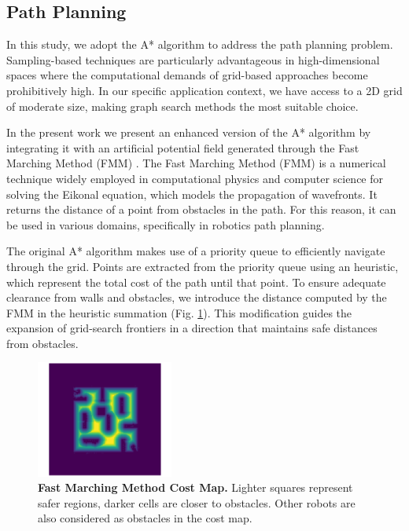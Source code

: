 \subsection{Path Planning}
In this study, we adopt the A* algorithm to address the path planning problem. Sampling-based techniques are particularly advantageous in high-dimensional spaces where the computational demands of grid-based approaches become prohibitively high. In our specific application context, we have access to a 2D grid of moderate size, making graph search methods the most suitable choice.

In the present work we present an enhanced version of the A* algorithm by integrating it with an artificial potential field generated through the Fast Marching Method (FMM) \cite{fast_marching}. 
The Fast Marching Method (FMM) \cite{fast_marching} is a numerical technique widely employed in computational physics and computer science for solving the Eikonal equation, which models the propagation of wavefronts. It returns the distance of a point from obstacles in the path. For this reason, it can be used in various domains, specifically in robotics path planning.

The original A* algorithm makes use of a priority queue to efficiently navigate through the grid. Points are extracted from the priority queue using an heuristic, which represent the total cost of the path until that point. To ensure adequate clearance from walls and obstacles, we introduce the distance computed by the FMM in the heuristic summation (Fig. \ref{fig:costmap}). This modification guides the expansion of grid-search frontiers in a direction that maintains safe distances from obstacles.

\begin{figure}[H]
  \begin{center}
    \includegraphics[width=0.4\textwidth]{img/costmap.png}
  \end{center}
  \caption[]{
    \textbf{Fast Marching Method Cost Map.} 
    Lighter squares represent safer regions, darker cells are closer to obstacles. Other robots are also considered as obstacles in the cost map.
  }
  \label{fig:costmap}
\end{figure}


